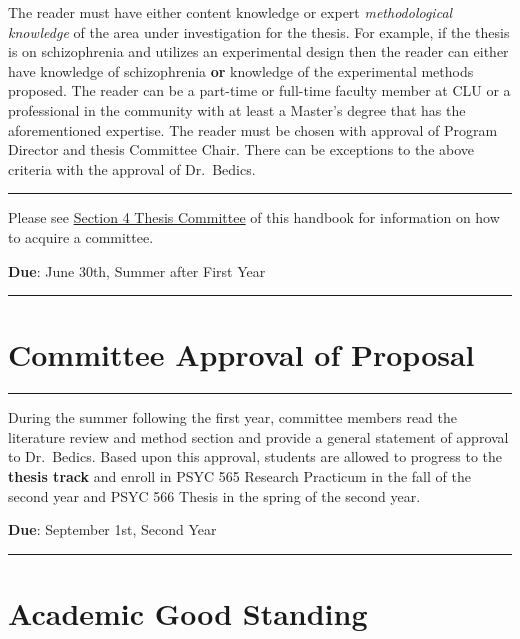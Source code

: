 \documentclass[openany]{book}
\begin{document}
The reader must have either content knowledge or expert \emph{methodological knowledge} of the area under investigation for the thesis. For example, if the thesis is on schizophrenia and utilizes an experimental design then the reader can either have knowledge of schizophrenia \textbf{or} knowledge of the experimental methods proposed. The reader can be a part-time or full-time faculty member at CLU or a professional in the community with at least a Master's degree that has the aforementioned expertise. The reader must be chosen with approval of Program Director and thesis Committee Chair. There can be exceptions to the above criteria with the approval of Dr.~Bedics.

\begin{center}\rule{0.5\linewidth}{0.5pt}\end{center}

Please see \protect\hyperlink{people}{Section 4 Thesis Committee} of this handbook for information on how to acquire a committee.

\textbf{Due}: June 30th, Summer after First Year

\begin{center}\rule{0.5\linewidth}{0.5pt}\end{center}

\hypertarget{committee-approval-of-proposal}{%
\section{Committee Approval of Proposal}\label{committee-approval-of-proposal}}

\begin{center}\rule{0.5\linewidth}{0.5pt}\end{center}

During the summer following the first year, committee members read the literature review and method section and provide a general statement of approval to Dr.~Bedics. Based upon this approval, students are allowed to progress to the \textbf{thesis track} and enroll in PSYC 565 Research Practicum in the fall of the second year and PSYC 566 Thesis in the spring of the second year.

\textbf{Due}: September 1st, Second Year

\begin{center}\rule{0.5\linewidth}{0.5pt}\end{center}

\hypertarget{academic-good-standing}{%
\section{Academic Good Standing}\label{academic-good-standing}}
\end{document}
